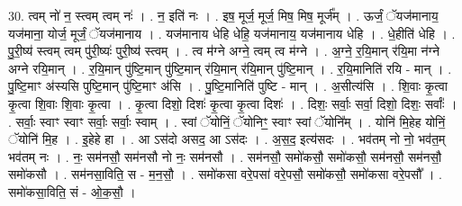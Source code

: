 \documentclass[17pt]{extarticle}
\begin{document}
30. त्वम् नो॑ न॒ स्त्वम् त्वम् नः॑ । . न॒ इति॑ नः । . इष॒ मूर्ज॒ मूर्ज॒ मिष॒ मिष॒ मूर्ज᳚म् । . ऊर्जं॒ ॅयज॑मानाय॒ यज॑माना॒ योर्ज॒ मूर्जं॒ ॅयज॑मानाय । . यज॑मानाय धेहि धेहि॒ यज॑मानाय॒ यज॑मानाय धेहि । . धे॒हीति॑ धेहि । . पु॒री॒ष्य॑ स्त्वम् त्वम् पु॑री॒ष्यः॑ पुरी॒ष्य॑ स्त्वम् । . त्व म॑ग्ने अग्ने॒ त्वम् त्व म॑ग्ने । . अ॒ग्ने॒ र॒यि॒मान् र॑यि॒मा न॑ग्ने अग्ने रयि॒मान् । . र॒यि॒मान् पु॑ष्टि॒मान् पु॑ष्टि॒मान् र॑यि॒मान् र॑यि॒मान् पु॑ष्टि॒मान् । . र॒यि॒मानिति॑ रयि - मान् । . पु॒ष्टि॒माꣳ अ॑स्यसि पुष्टि॒मान् पु॑ष्टि॒माꣳ अ॑सि । . पु॒ष्टि॒मानिति॑ पुष्टि - मान् । . अ॒सीत्य॑सि । . शि॒वाः कृ॒त्वा कृ॒त्वा शि॒वाः शि॒वाः कृ॒त्वा । . कृ॒त्वा दिशो॒ दिशः॑ कृ॒त्वा कृ॒त्वा दिशः॑ । . दिशः॒ सर्वाः॒ सर्वा॒ दिशो॒ दिशः॒ सर्वाः᳚ । . सर्वाः॒ स्वाꣳ स्वाꣳ सर्वाः॒ सर्वाः॒ स्वाम् । . स्वां ॅयोनिं॒ ॅयोनिꣳ॒॒ स्वाꣳ स्वां ॅयोनि᳚म् । . योनि॑ मि॒हेह योनिं॒ ॅयोनि॑ मि॒ह । . इ॒हेहे हा । . आ ऽस॑दो असद॒ आ ऽस॑दः । . अ॒स॒द॒ इत्य॑सदः । . भव॑तम् नो नो॒ भव॑त॒म् भव॑तम् नः । . नः॒ सम॑नसौ॒ सम॑नसौ नो नः॒ सम॑नसौ । . सम॑नसौ॒ समो॑कसौ॒ समो॑कसौ॒ सम॑नसौ॒ सम॑नसौ॒ समो॑कसौ । . सम॑नसा॒विति॒ स - म॒न॒सौ॒ । . समो॑कसा वरे॒पसा॑ वरे॒पसौ॒ समो॑कसौ॒ समो॑कसा वरे॒पसौ᳚ । . समो॑कसा॒विति॒ सं - ओ॒क॒सौ॒ । \newline
\end{document}
